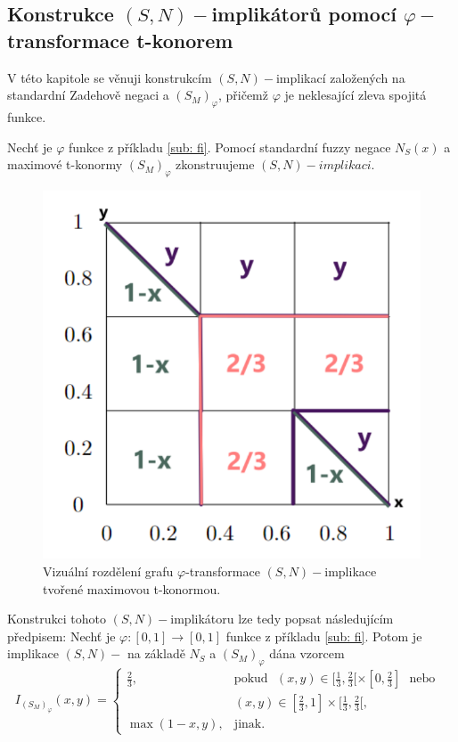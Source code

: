 \subsection{Konstrukce $(S,N)-$implik\'ator\r u pomoc\'i $\varphi-$transformace t-konorem}
 V této kapitole se věnuji konstrukcím $(S,N)-$implikací založených na standardní Zadehově negaci a $(S_M)_\varphi$, přičemž $\varphi$ je neklesající zleva spojitá funkce.
 
\begin{example}
    Nech\v t je $\varphi$ funkce z p\v ríkladu \ref{sub: fi}.  Pomocí standardní fuzzy negace $N_S(x)$ a maximové t-konormy $(S_M)_\varphi$  zkonstruujeme $(S,N)-implikaci$. 
\end{example}

\begin{figure}[H]
\caption{ Vizu\' aln\' i rozd\v elen\'i grafu $\varphi$-transformace $(S,N)-$implikace tvořené maximovou t-konormou.}
        \centering
        \includegraphics[scale=0.8]{template-fig/phi-impli.pdf}
\end{figure}


 Konstrukci tohoto $(S,N)-$implikátoru lze tedy popsat následujícím předpisem:
    Nech\v t je  $\varphi:[0,1]\rightarrow [0,1]$
funkce z příkladu \ref{sub: fi}.
Potom je implikace $(S,N)-$ na základě $N_S$ a $(S_M)_{\varphi}$ dána vzorcem
$$ I_{(S_M)_{\varphi}}(x,y) = \begin{cases} \frac{2}{3}, &\mbox {pokud~~}
(x,y)\in [\frac{1}{3},\frac{2}{3}[\times[0,\frac{2}{3}] \mbox{~~nebo~~}
\\ & (x,y)\in [\frac{2}{3},1]\times[\frac{1}{3},\frac{2}{3}[,
\\ \max(1-x,y), &\mbox {jinak.}
\end{cases} $$

